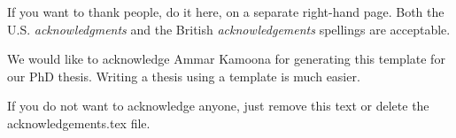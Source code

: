 \acknowledgements
{
If you want to thank people, do it here, on a separate right-hand page. Both the U.S. \textit{acknowledgments} and the British \textit{acknowledgements} spellings are acceptable.



We would like to acknowledge Ammar Kamoona for generating this template for our PhD thesis. Writing a thesis using a template is much easier.

If you do not want to acknowledge anyone, just remove this text or delete the acknowledgements.tex file.
}
